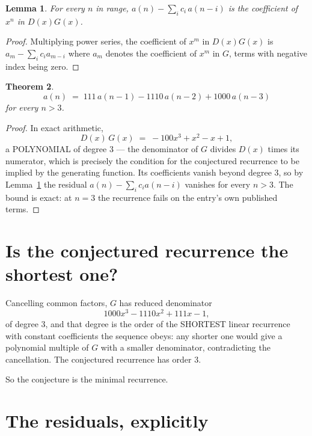 \documentclass[11pt,a4paper]{article}
\theoremstyle{plain}
\newtheorem{theorem}{Theorem}
\newtheorem{lemma}[theorem]{Lemma}
\theoremstyle{definition}
\begin{document}
\begin{lemma}\label{lem:key}
For every $n$ in range, $a(n)-\sum_i c_i\,a(n-i)$ is the coefficient of $x^{n}$ in
$D(x)G(x)$.
\end{lemma}

\begin{proof}
Multiplying power series, the coefficient of $x^{m}$ in $D(x)G(x)$ is
$a_m-\sum_i c_i a_{m-i}$ where $a_m$ denotes the coefficient of $x^{m}$ in $G$, terms with
negative index being zero.
\end{proof}

\begin{theorem}
\[
a(n)\;=\;111\,a(n-1) - 1110\,a(n-2) + 1000\,a(n-3)
\]
for every $n>3$.
\end{theorem}

\begin{proof}
In exact arithmetic,
\[
D(x)\,G(x)\;=\;- 100 x^{3} + x^{2} - x + 1,
\]
a POLYNOMIAL of degree $3$ --- the denominator of $G$ divides $D(x)$ times its numerator,
which is precisely the condition for the conjectured recurrence to be implied by the
generating function. Its coefficients vanish beyond degree $3$, so by
Lemma~\ref{lem:key} the residual $a(n)-\sum_ic_ia(n-i)$ vanishes for every
$n>3$. The bound is exact: at $n=3$ the recurrence fails on the entry's own published terms.
\end{proof}

\section{Is the conjectured recurrence the shortest one?}

Cancelling common factors, $G$ has reduced denominator
\[
1000 x^{3} - 1110 x^{2} + 111 x - 1,
\]
of degree $3$, and that degree is the order of the SHORTEST linear recurrence with
constant coefficients the sequence obeys: any shorter one would give a polynomial multiple of
$G$ with a smaller denominator, contradicting the cancellation. The conjectured recurrence has
order $3$.

So the conjecture is the minimal recurrence.

\section{The residuals, explicitly}
\end{document}
